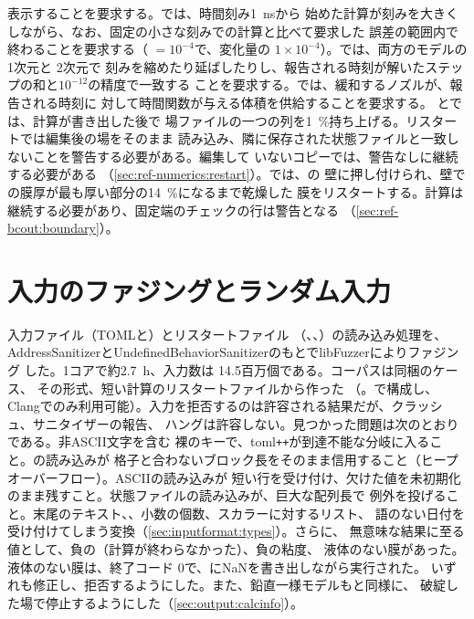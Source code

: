 表示することを要求する。では、時間刻み\SI{1}{\nano\second}から
始めた計算が刻みを大きくしながら、なお、固定の小さな刻みでの計算と比べて要求した
誤差の範囲内で終わることを要求する（ $=10^{-4}$で、変化量の
$1\times10^{-4}$）。では、両方のモデルの 1次元と 2次元で
刻みを縮めたり延ばしたりし、報告される時刻が解いたステップの和と$10^{-12}$の精度で一致する
ことを要求する。では、緩和するノズルが、報告される時刻に
対して時間関数が与える体積を供給することを要求する。
とでは、計算が書き出した後で
場ファイルの一つの列を\SI{1}{\percent}持ち上げる。リスタートでは編集後の場をそのまま
読み込み、隣に保存された状態ファイルと一致しないことを警告する必要がある。編集して
いないコピーでは、警告なしに継続する必要がある
（\cref{sec:ref-numerics:restart}）。では、の
壁に押し付けられ、壁での膜厚が最も厚い部分の\SI{14}{\percent}になるまで乾燥した
膜をリスタートする。計算は継続する必要があり、固定端のチェックの行は警告となる
（\cref{sec:ref-bcout:boundary}）。

\section{入力のファジングとランダム入力}
\label{sec:verification:fuzzing}

入力ファイル（TOMLと）とリスタートファイル
（、、）の読み込み処理を、
AddressSanitizerとUndefinedBehaviorSanitizerのもとでlibFuzzerによりファジング
した。1コアで約\SI{2.7}{\hour}、入力数は 14.5百万個である。コーパスは同梱のケース、
その形式、短い計算のリスタートファイルから作った
（。で構成し、
Clangでのみ利用可能）。入力を拒否するのは許容される結果だが、クラッシュ、サニタイザーの報告、
ハングは許容しない。見つかった問題は次のとおりである。非ASCII文字を含む
裸のキーで、toml\texttt{++}が到達不能な分岐に入ること。の読み込みが
格子と合わないブロック長をそのまま信用すること（ヒープオーバーフロー）。ASCIIの読み込みが
短い行を受け付け、欠けた値を未初期化のまま残すこと。状態ファイルの読み込みが、巨大な配列長で
例外を投げること。末尾のテキスト、、小数の個数、スカラーに対するリスト、
語のない日付を受け付けてしまう変換（\cref{sec:inputformat:types}）。さらに、
無意味な結果に至る値として、負の（計算が終わらなかった）、負の粘度、
液体のない膜があった。液体のない膜は、終了コード 0で、にNaNを書き出しながら実行された。
いずれも修正し、拒否するようにした。また、鉛直一様モデルもと同様に、
破綻した場で停止するようにした（\cref{sec:output:calcinfo}）。

